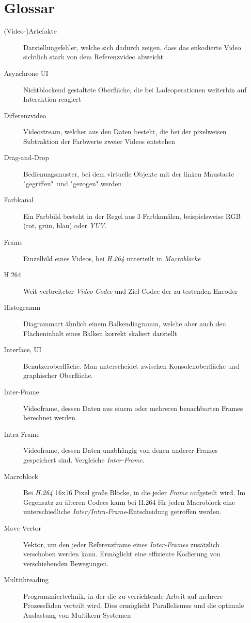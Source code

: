 \section{Glossar}

\begin{description}
    \item[(Video-)Artefakte] Darstellungsfehler, welche sich dadurch zeigen, dass das enkodierte Video sichtlich stark von dem Referenzvideo abweicht
    \item[Asynchrone UI] Nichtblockend gestaltete Oberfläche, die bei Ladeoperationen weiterhin auf Interaktion reagiert
    \item[Differenzvideo] Videostream, welcher aus den Daten besteht, die bei der pixelweisen Subtraktion der Farbwerte zweier Videos entstehen
    \item[Drag-and-Drop] Bedienungsmuster, bei dem virtuelle Objekte mit der linken Maustaste "gegriffen"\ und "gezogen" werden
    \item[Farbkanal] Ein Farbbild besteht in der Regel aus 3 Farbkanälen, beispielsweise RGB (rot, grün, blau) oder \emph{YUV}.
    \item[Frame] Einzelbild eines Videos, bei \emph{H.264} unterteilt in \emph{Macroblöcke}
    \item[H.264] Weit verbreiteter \emph{Video-Codec} und Ziel-Codec der zu testenden Encoder
    \item[Histogramm] Diagrammart ähnlich einem Balkendiagramm, welche aber auch den Flächeninhalt eines Balken korrekt skaliert darstellt
    \item[Interface, UI] Benutzeroberfläche. Man unterscheidet zwischen Konsolenoberfläche und graphischer Oberfläche.
    \item[Inter-Frame] Videoframe, dessen Daten aus einem oder mehreren benachbarten Frames berechnet werden.
    \item[Intra-Frame] Videoframe, dessen Daten unabhängig von denen anderer Frames gespeichert sind. Vergleiche \emph{Inter-Frame}.
    \item[Macroblock] Bei \emph{H.264} 16x16 Pixel große Blöcke, in die jeder \emph{Frame} aufgeteilt wird. Im Gegensatz zu älteren Codecs kann bei H.264 für jeden Macroblock eine unterschiedliche \emph{Inter/Intra-Frame}-Entscheidung getroffen werden. 
    \item[Move Vector] Vektor, um den jeder Referenzframe eines \emph{Inter-Frames} zusätzlich verschoben werden kann. Ermöglicht eine effiziente Kodierung von verschiebenden Bewegungen.
    \item[Multithreading] Programmiertechnik, in der die zu verrichtende Arbeit auf mehrere Prozessfäden verteilt wird. Dies ermöglicht Parallelismus und die optimale Auslastung von Multikern-Systemen

\end{description}
